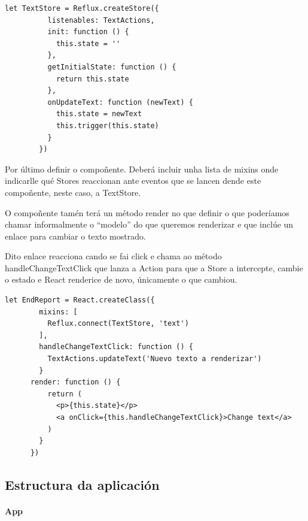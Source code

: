      \begin{lstlisting}[frame=single]
        let TextStore = Reflux.createStore({
          listenables: TextActions,
          init: function () {
            this.state = ''
          },
          getInitialState: function () {
            return this.state
          },
          onUpdateText: function (newText) {
            this.state = newText
            this.trigger(this.state)
          }
        })
    \end{lstlisting}

    Por último definir o compoñente. Deberá incluir unha lista de mixins onde 
indicarlle qué Stores reaccionan ante eventos que se lancen dende este 
compoñente, neste caso, a TextStore.

    O compoñente tamén terá un método render no que definir o que poderíamos 
chamar informalmente o ``modelo'' do que queremos renderizar e que inclúe un 
enlace para cambiar o texto mostrado.

    Dito enlace reacciona cando se fai click e chama ao método 
handleChangeTextClick que lanza a Action para que a Store a intercepte, cambie 
o estado e React renderice de novo, únicamente o que cambiou.



     \begin{lstlisting}[frame=single]
      let EndReport = React.createClass({
        mixins: [
          Reflux.connect(TextStore, 'text')
        ],
        handleChangeTextClick: function () {
          TextActions.updateText('Nuevo texto a renderizar')
        }
      render: function () {
          return (
            <p>{this.state}</p>
            <a onClick={this.handleChangeTextClick}>Change text</a>
          )
        }
      })
    \end{lstlisting}


    \subsection{Estructura da aplicación}
    
    \paragraph{App}

